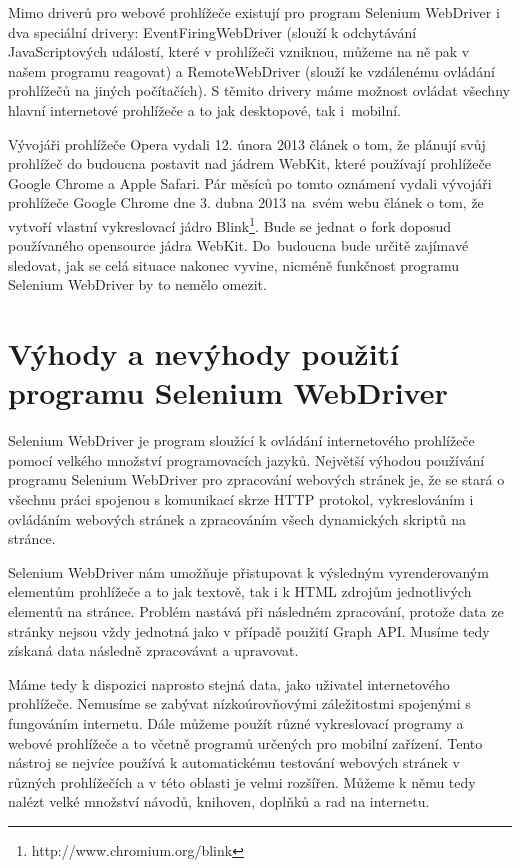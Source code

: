\documentclass[thesis=M,czech]{FITthesis}[2013/05/10]
\begin{document}
Mimo driverů pro webové prohlížeče existují pro program Selenium WebDriver i dva speciální drivery: EventFiringWebDriver (slouží k odchytávání JavaScriptových událostí, které v prohlížeči vzniknou, můžeme na ně pak v našem programu reagovat) a RemoteWebDriver (slouží ke vzdálenému ovládání prohlížečů na jiných počítačích). S těmito drivery máme možnost ovládat všechny hlavní internetové prohlížeče a to jak desktopové, tak i~mobilní.

Vývojáři prohlížeče Opera vydali 12. února 2013 
článek \cite{web:operaMovesToWebkit} o tom, že plánují svůj prohlížeč do budoucna postavit nad jádrem WebKit, které používají prohlížeče Google Chrome a Apple Safari. Pár měsíců po tomto oznámení vydali vývojáři prohlížeče Google Chrome dne 3. dubna 2013 na~svém webu článek \cite{web:chromiumBlink} o tom, že vytvoří vlastní vykreslovací jádro Blink\footnote{http://www.chromium.org/blink}. Bude se jednat o fork doposud používaného opensource jádra WebKit. Do~budoucna bude určitě zajímavé sledovat, jak se celá situace nakonec vyvine, nicméně funkčnost programu Selenium WebDriver by to nemělo omezit.

\section{Výhody a nevýhody použití programu Selenium WebDriver}

Selenium WebDriver je program sloužící k ovládání internetového prohlížeče pomocí velkého množství programovacích jazyků. Největší výhodou používání programu Selenium WebDriver pro zpracování webových stránek je, že se stará o všechnu práci spojenou s komunikací skrze HTTP protokol, vykreslováním i ovládáním webových stránek a zpracováním všech dynamických skriptů na stránce. 

Selenium WebDriver nám umožňuje přistupovat k výsledným vyrenderovaným elementům prohlížeče a to jak textově, tak i k HTML zdrojům jednotlivých elementů na stránce. Problém nastává při následném zpracování, protože data ze stránky nejsou vždy jednotná jako v případě použití Graph API. Musíme tedy získaná data následně zpracovávat a upravovat.

Máme tedy k dispozici naprosto stejná data, jako uživatel internetového prohlížeče. Nemusíme se zabývat nízkoúrovňovými záležitostmi spojenými s fungováním internetu. Dále můžeme použít různé vykreslovací programy a webové prohlížeče a to včetně programů určených pro mobilní zařízení. Tento nástroj se nejvíce používá k automatickému testování webových stránek v různých prohlížečích a v této oblasti je velmi rozšířen. Můžeme k němu tedy nalézt velké množství návodů, knihoven, doplňků a rad na internetu. 
\end{document}
